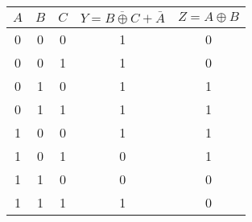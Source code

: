 \documentclass[]{article}
\begin{document}
\begin{center}
	\begin{tabular}{|c|c|c|c|c|}
		\hline \rule{0pt}{11pt} $A$ & $B$ & $C$ & $Y = \overline{B \oplus C} + \bar{A}$ & $Z = A \oplus B$ \\
		\hline 0                    & 0   & 0   & 1                                     & 0                \\
		0                           & 0   & 1   & 1                                     & 0                \\
		0                           & 1   & 0   & 1                                     & 1                \\
		0                           & 1   & 1   & 1                                     & 1                \\
		1                           & 0   & 0   & 1                                     & 1                \\
		1                           & 0   & 1   & 0                                     & 1                \\
		1                           & 1   & 0   & 0                                     & 0                \\
		1                           & 1   & 1   & 1                                     & 0                \\
		\hline
	\end{tabular}
\end{center}
\end{document}
